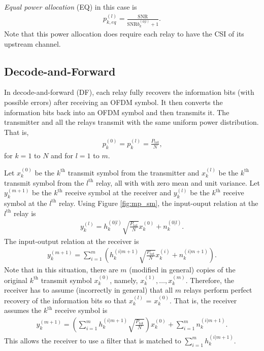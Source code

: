 \documentclass[journal]{IEEEtran}
\begin{document}
\emph{Equal power allocation} (EQ) in this case is
\begin{eqnarray}
p_{k,eq}^{(l)} =  \frac{ \mbox{SNR}}
{\displaystyle  \mbox{SNR} b_k^{(0|l)} + 1} \mbox{.}
\end{eqnarray}
Note that this power allocation does require each relay to have the CSI of its upstream channel.

\subsection{Decode-and-Forward}
In decode-and-forward (DF), each relay fully recovers the information bits (with possible errors) after receiving an OFDM symbol.  It then converts the information bits back into an OFDM symbol and then transmits it.  The transmitter and all the relays transmit with the same uniform power distribution.  That is,
\begin{eqnarray}
p_k^{(0)} = p_k^{(l)} = \frac{P_{\mbox{tot}}}{N}\mbox{,}
\end{eqnarray}
for $k = 1$ to $N$ and for $l = 1$ to $m$.

Let $x_k^{(0)}$ be the $k^{\mbox{th}}$ transmit symbol from the transmitter and  $x_k^{(l)}$ be the $k^{\mbox{th}}$ transmit symbol from the $l^{\mbox{th}}$ relay, all with with zero mean and unit variance.  Let $y_k^{(m+1)}$ be the $k^{\mbox{th}}$ receive symbol at the receiver and  $y_k^{(l)}$ be the $k^{\mbox{th}}$ receive symbol at the $l^{\mbox{th}}$ relay.  Using Figure \ref{fig:mp_sm}, the input-ouput relation at the $l^{\mbox{th}}$ relay is
\begin{eqnarray}
y_k^{(l)} = h_k^{(0|l)} \sqrt{\frac{P_{\mbox{tot}}}{N}} x_k^{(0)} + n_k^{(0|l)} \mbox{.}
\end{eqnarray}
The input-output relation at the receiver is
\begin{eqnarray}
y_k^{(m+1)} = \sum_{i=1}^m\left( h_k^{(i|m+1)}  \sqrt{\frac{P_{\mbox{tot}}}{N}} x_k^{(i)} + n_k^{(i|m+1)} \right)\mbox{.}
\end{eqnarray}
Note that in this situation, there are $m$ (modified in general) copies of the original $k^{\mbox{th}}$ transmit symbol $x_k^{(0)}$, namely, $x_k^{(1)}, \ldots, x_k^{(m)}$.  Therefore, the receiver has to assume (incorrectly in general) that all $m$ relays perform perfect recovery of the information bits so that $x_k^{(l)}$ = $x_k^{(0)}$.  That is, the receiver assumes the $k^{\mbox{th}}$ receive symbol is
\begin{eqnarray}
y_k^{(m+1)} = \left( \sum_{i=1}^m h_k^{(i|m+1)}
\sqrt{\frac{P_{\mbox{tot}}}{N}} \right) x_k^{(0)} + \sum_{i=1}^m
n_k^{(i|m+1)} \mbox{.}
\end{eqnarray}
This allows the receiver to use a filter that is matched to $\displaystyle \sum_{i=1}^m h_k^{(i|m+1)}$.
\end{document}
